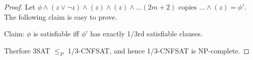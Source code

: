 \documentclass[10pt,landscape]{article}
\theoremstyle{plain}%
\theoremstyle{definition}
\theoremstyle{remark}
\begin{document}
\begin{multicols}{3}
\begin{proof}
Let $\phi \land (z \lor \lnot z) \land (z) \land (z) \land ... (2m+2) $ copies $...\land (z) = \phi'$. The following claim is easy to prove.

Claim: $\phi$ is satisfiable iff $\phi'$ has exactly 1/3rd satisfiable clauses.

Therfore 3SAT $\leq_P$ 1/3-CNFSAT, and hence 1/3-CNFSAT is NP-complete.

\end{proof}

\end{multicols}
\end{document}
